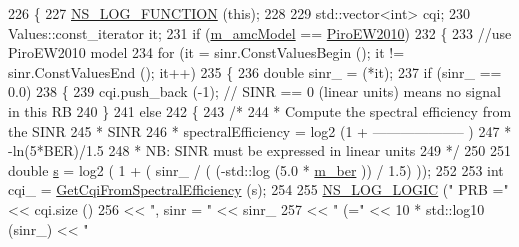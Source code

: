 \begin{DoxyCode}
226 \{
227         \hyperlink{log-macros-disabled_8h_a90b90d5bad1f39cb1b64923ea94c0761}{NS\_LOG\_FUNCTION} (\textcolor{keyword}{this});
228 
229         std::vector<int> cqi;
230         Values::const\_iterator it;
231         \textcolor{keywordflow}{if} (\hyperlink{classns3_1_1MmWaveAmc_a4518d21ebad09825dd22466951c6935b}{m\_amcModel} == \hyperlink{classns3_1_1MmWaveAmc_a2805c1e6b48cb88e9cf86b062e079401aa7b0954f22ca97fa89b0d794155245d0}{PiroEW2010})
232         \{
233                 \textcolor{comment}{//use PiroEW2010 model}
234                 \textcolor{keywordflow}{for} (it = sinr.ConstValuesBegin (); it != sinr.ConstValuesEnd (); it++)
235                 \{
236                         \textcolor{keywordtype}{double} sinr\_ = (*it);
237                         \textcolor{keywordflow}{if} (sinr\_ == 0.0)
238                         \{
239                                 cqi.push\_back (-1); \textcolor{comment}{// SINR == 0 (linear units) means no signal in this RB}
240                         \}
241                         \textcolor{keywordflow}{else}
242                         \{
243                         \textcolor{comment}{/*}
244 \textcolor{comment}{                        * Compute the spectral efficiency from the SINR}
245 \textcolor{comment}{                        *                                        SINR}
246 \textcolor{comment}{                        * spectralEfficiency = log2 (1 + -------------------- )}
247 \textcolor{comment}{                        *                                    -ln(5*BER)/1.5}
248 \textcolor{comment}{                        * NB: SINR must be expressed in linear units}
249 \textcolor{comment}{                        */}
250 
251                         \textcolor{keywordtype}{double} \hyperlink{generate__test__data__lte__sinr_8m_ad83eeb3a142285d1243a08c6b7026df8}{s} = log2 ( 1 + ( sinr\_ / ( (-std::log (5.0 * 
      \hyperlink{classns3_1_1MmWaveAmc_ac0e911c1ebab08ab7c52713ea5b35a15}{m\_ber} )) / 1.5) ));
252 
253                         \textcolor{keywordtype}{int} cqi\_ = \hyperlink{classns3_1_1MmWaveAmc_acbe2e5714d389d77b25d1dfbe433a806}{GetCqiFromSpectralEfficiency} (s);
254 
255                         \hyperlink{group__logging_ga88acd260151caf2db9c0fc84997f45ce}{NS\_LOG\_LOGIC} (\textcolor{stringliteral}{" PRB ="} << cqi.size ()
256                                                                 << \textcolor{stringliteral}{", sinr = "} << sinr\_
257                                                                 << \textcolor{stringliteral}{" (="} << 10 * std::log10 (sinr\_) << \textcolor{stringliteral}{"
}
\end{DoxyCode}
